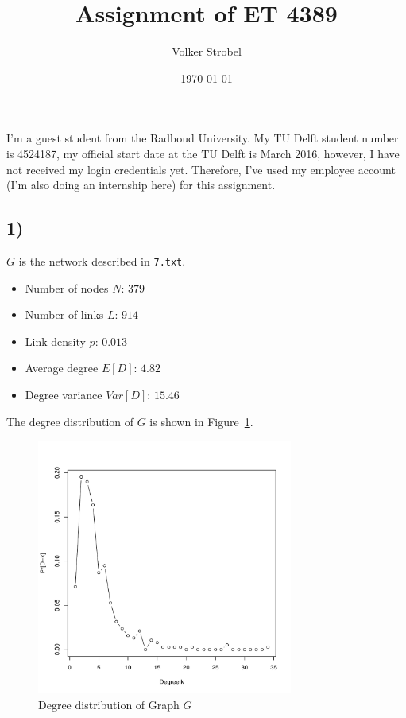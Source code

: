 \documentclass{article}
\title{Assignment of ET 4389}
\author{Volker Strobel}
\date{\today}
\begin{document}
\maketitle

I'm a guest student from the Radboud University. My TU Delft student
number is 4524187, my official start date at the TU Delft is March
2016, however, I have not received my login credentials
yet. Therefore, I've used my employee account (I'm also doing an
internship here) for this assignment.

\subsection*{1)}
$G$ is the network described in \texttt{7.txt}.

\begin{itemize}
  \item Number of nodes $N$: $379$ 
  \item Number of links $L$: $914$
  \item Link density $p$: $0.013$
  \item Average degree $E[D]$: $4.82$
  \item Degree variance $Var[D]$: $15.46$
\end{itemize}
The degree distribution of $G$ is shown in
Figure~\ref{fig:degree-distribution}.
\begin{figure}[H]
  \centering
  \includegraphics[width=0.75\textwidth]{degree_distribution_1}
  \caption{Degree distribution of Graph $G$}
  \label{fig:degree-distribution}
\end{figure}
\end{document}
